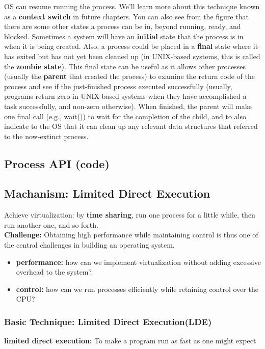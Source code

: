 \documentclass{article}
\begin{document}
OS can resume running the process. We’ll learn more about this technique
known as a \textbf{context switch} in future chapters.
You can also see from the figure that there are some other states a process
can be in, beyond running, ready, and blocked. Sometimes a system
will have an \textbf{initial} state that the process is in when it is being created.
Also, a process could be placed in a \textbf{final} state where it has exited but has not yet been cleaned up (in UNIX-based systems, this is called the
\textbf{zombie state}). This final state can be useful as it allows other processes
(usually the \textbf{parent} that created the process) to examine the return code
of the process and see if the just-finished process executed successfully
(usually, programs return zero in UNIX-based systems when they have
accomplished a task successfully, and non-zero otherwise). When finished,
the parent will make one final call (e.g., wait()) to wait for the
completion of the child, and to also indicate to the OS that it can clean up
any relevant data structures that referred to the now-extinct process.

\pagebreak

\subsection{Process API (code)}
\pagebreak

\subsection{Machanism: Limited Direct Execution}
Achieve virtualization: by \textbf{time sharing}, run one process for a little while, then run another one, and so forth.\\
\textbf{Challenge: }Obtaining high performance while maintaining control is thus
one of the central challenges in building an operating system.
\begin{itemize}
    \item \textbf{performance: }how can we implement virtualization without adding excessive overhead to the system?
    \item \textbf{control: }how can we run processes efficiently while retaining control over the CPU?
\end{itemize}

\subsubsection{Basic Technique: Limited Direct Execution(LDE)}
\textbf{limited direct execution: }To make a program run as fast as one might expect
\end{document}
